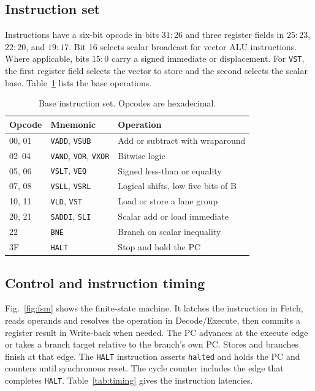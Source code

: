 \documentclass[conference]{IEEEtran}
\begin{document}
\subsection{Instruction set}

Instructions have a six-bit opcode in bits \(31{:}26\) and three register
fields in \(25{:}23\), \(22{:}20\), and \(19{:}17\). Bit 16 selects scalar
broadcast for vector ALU instructions. Where applicable, bits \(15{:}0\)
carry a signed immediate or displacement. For \texttt{VST}, the first
register field selects the vector to store and the second selects the
scalar base. Table~\ref{tab:isa} lists the base operations.

\begin{table}[!t]
\caption{Base instruction set. Opcodes are hexadecimal.}
\label{tab:isa}
\centering
\small
\setlength{\tabcolsep}{4pt}
\begin{tabular}{@{}ll>{\raggedright\arraybackslash}p{}@{}}
\toprule
Opcode & Mnemonic & Operation \\
\midrule
00, 01 & \texttt{VADD}, \texttt{VSUB} & Add or subtract with wraparound \\
02--04 & \texttt{VAND}, \texttt{VOR}, \texttt{VXOR} & Bitwise logic \\
05, 06 & \texttt{VSLT}, \texttt{VEQ} & Signed less-than or equality \\
07, 08 & \texttt{VSLL}, \texttt{VSRL} & Logical shifts, low five bits of B \\
10, 11 & \texttt{VLD}, \texttt{VST} & Load or store a lane group \\
20, 21 & \texttt{SADDI}, \texttt{SLI} & Scalar add or load immediate \\
22 & \texttt{BNE} & Branch on scalar inequality \\
3F & \texttt{HALT} & Stop and hold the PC \\
\bottomrule
\end{tabular}
\end{table}

\subsection{Control and instruction timing}

Fig.~\ref{fig:fsm} shows the finite-state machine. It latches the instruction
in Fetch, reads operands and resolves the operation in Decode/Execute,
then commits a register result in Write-back when needed. The PC advances
at the execute edge or takes a branch target relative to the branch's own
PC. Stores and branches finish at that edge. The \texttt{HALT} instruction
asserts \texttt{halted} and holds the PC and counters until synchronous reset.
The cycle counter includes the edge that completes \texttt{HALT}.
Table~\ref{tab:timing} gives the instruction latencies.
\end{document}
